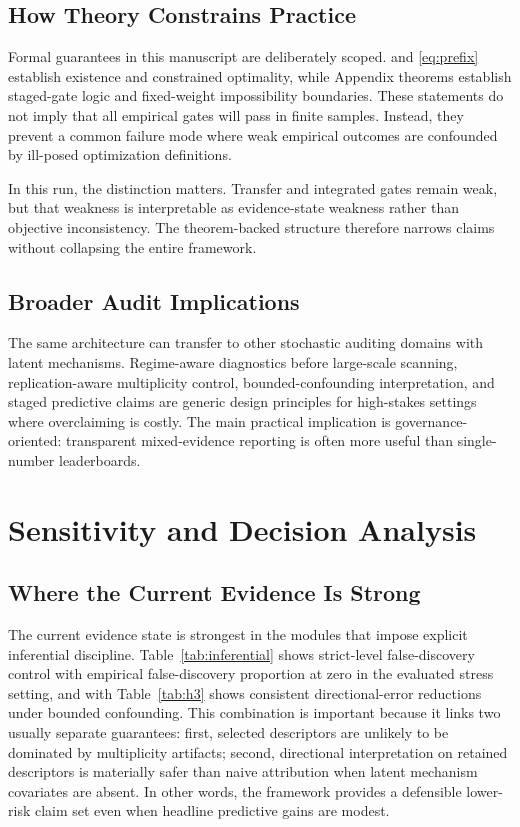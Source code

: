 \documentclass{article} %
\begin{document}
\subsection{How Theory Constrains Practice}
Formal guarantees in this manuscript are deliberately scoped.  and \eqref{eq:prefix} establish existence and constrained optimality, while Appendix theorems establish staged-gate logic and fixed-weight impossibility boundaries. These statements do not imply that all empirical gates will pass in finite samples. Instead, they prevent a common failure mode where weak empirical outcomes are confounded by ill-posed optimization definitions.

In this run, the distinction matters. Transfer and integrated gates remain weak, but that weakness is interpretable as evidence-state weakness rather than objective inconsistency. The theorem-backed structure therefore narrows claims without collapsing the entire framework.

\subsection{Broader Audit Implications}
The same architecture can transfer to other stochastic auditing domains with latent mechanisms. Regime-aware diagnostics before large-scale scanning, replication-aware multiplicity control, bounded-confounding interpretation, and staged predictive claims are generic design principles for high-stakes settings where overclaiming is costly. The main practical implication is governance-oriented: transparent mixed-evidence reporting is often more useful than single-number leaderboards.

\section{Sensitivity and Decision Analysis}\label{sec:sensitivity}
\subsection{Where the Current Evidence Is Strong}
The current evidence state is strongest in the modules that impose explicit inferential discipline. Table~\ref{tab:inferential} shows strict-level false-discovery control with empirical false-discovery proportion at zero in the evaluated stress setting, and  with Table~\ref{tab:h3} shows consistent directional-error reductions under bounded confounding. This combination is important because it links two usually separate guarantees: first, selected descriptors are unlikely to be dominated by multiplicity artifacts; second, directional interpretation on retained descriptors is materially safer than naive attribution when latent mechanism covariates are absent. In other words, the framework provides a defensible lower-risk claim set even when headline predictive gains are modest.
\end{document}
